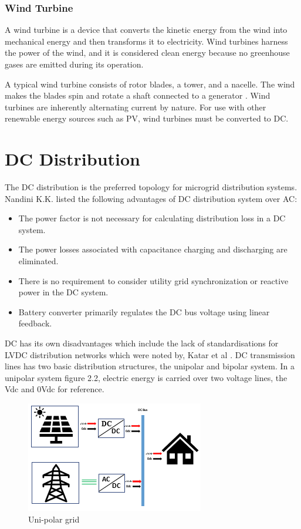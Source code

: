 \subsubsection{Wind Turbine} 
A wind turbine is a device that converts the kinetic energy from the wind into mechanical energy and then transforms it to electricity. Wind turbines harness the power of the wind, and it is considered clean energy because no greenhouse gases are emitted during its operation. \par
A typical wind turbine consists of rotor blades, a tower, and a nacelle. The wind makes the blades spin and rotate a shaft connected to a generator \cite{16}. Wind turbines are inherently alternating current by nature. For use with other renewable energy sources such as PV, wind turbines must be converted to DC. 
\section{DC Distribution}
The DC distribution is the preferred topology for microgrid distribution systems. Nandini K.K. \cite{17} listed the following advantages of DC distribution system over AC:
\begin{itemize}
	\item The power factor is not necessary for calculating distribution loss in a DC system.
	\item The power losses associated with capacitance charging and discharging are eliminated.
	\item There is no requirement to consider utility grid synchronization or reactive power in the DC system.
	\item Battery converter primarily regulates the DC bus voltage using linear feedback. 
\end{itemize}
DC has its own disadvantages which include the lack of standardisations for LVDC distribution networks which were noted by, Katar et al \cite{18}. DC transmission lines has two basic distribution structures, the unipolar and bipolar system.
In a unipolar system figure 2.2, electric energy is carried over two voltage lines, the Vdc and 0Vdc for reference.
\begin{figure}[H]
	\centering
	\includegraphics[totalheight=6cm]{Figures/unipolar grid.png}
	\caption{Uni-polar grid}
\end{figure}

